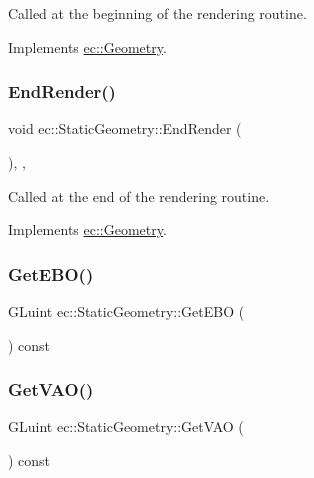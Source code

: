 Called at the beginning of the rendering routine. 

Implements \mbox{\hyperlink{classec_1_1_geometry_a184b4fdde8062c1dc0eb9e3393cc540f}{ec\+::\+Geometry}}.

\mbox{\label{classec_1_1_static_geometry_a2a66505344ad1a9eac31da2cf8171ea9}} 
\subsubsection{\texorpdfstring{End\+Render()}{EndRender()}}
{\footnotesize\ttfamily void ec\+::\+Static\+Geometry\+::\+End\+Render (\begin{DoxyParamCaption}{ }\end{DoxyParamCaption})\hspace{0.3cm}{\ttfamily [override]}, {\ttfamily [protected]}, {\ttfamily [virtual]}}

Called at the end of the rendering routine. 

Implements \mbox{\hyperlink{classec_1_1_geometry_a41ed9550a0d1746c55add3c3c0a38984}{ec\+::\+Geometry}}.

\mbox{\label{classec_1_1_static_geometry_aafa07962d6488eb976146bc7d6351ec1}} 
\subsubsection{\texorpdfstring{Get\+E\+B\+O()}{GetEBO()}}
{\footnotesize\ttfamily G\+Luint ec\+::\+Static\+Geometry\+::\+Get\+E\+BO (\begin{DoxyParamCaption}{ }\end{DoxyParamCaption}) const}

\mbox{\label{classec_1_1_static_geometry_ae82f6d9fbad1e36e7bd97ed0aac94134}} 
\subsubsection{\texorpdfstring{Get\+V\+A\+O()}{GetVAO()}}
{\footnotesize\ttfamily G\+Luint ec\+::\+Static\+Geometry\+::\+Get\+V\+AO (\begin{DoxyParamCaption}{ }\end{DoxyParamCaption}) const}

